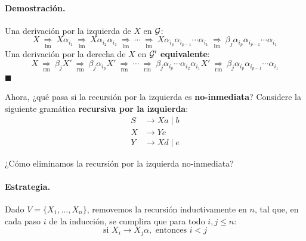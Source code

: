 \paragraph{Demostración.} Una derivación por la izquierda de $X$ en $\mathcal{G}$:
$$
    X \ \underset{\mathrm{lm}}{\Rightarrow} \ X \alpha_{i_1} \ \underset{\mathrm{lm}}{\Rightarrow} \ X \alpha_{i_2} \alpha_{i_1} \ \underset{\mathrm{lm}}{\Rightarrow} \ \cdots \ \underset{\mathrm{lm}}{\Rightarrow}\ X \alpha_{i_p} \alpha_{i_{p-1}} \cdots \alpha_{i_1} \ \underset{\mathrm{lm}}{\Rightarrow} \ \beta_j \alpha_{i_p} \alpha_{i_{p-1}} \cdots \alpha_{i_1}
$$
Una derivación por la derecha de $X$ en $\mathcal{G}'$ \textbf{equivalente}:
$$
    X \ \underset{\mathrm{rm}}{\Rightarrow} \ \beta_j X' \ \underset{\mathrm{rm}}{\Rightarrow} \ \beta_j \alpha_{i_p} X' \ \underset{\mathrm{rm}}{\Rightarrow} \ \cdots \ \underset{\mathrm{rm}}{\Rightarrow}\ \beta_j \alpha_{i_p} \cdots \alpha_{i_2} \alpha_{i_1} X' \ \underset{\mathrm{rm}}{\Rightarrow} \ \beta_j \alpha_{i_p} \alpha_{i_{p-1}} \cdots \alpha_{i_1}
$$
\hfill $\blacksquare$ \bigbreak

Ahora, ¿qué pasa si la recursión por la izquierda es \textbf{no-inmediata}? Considere la siguiente gramática \textbf{recursiva por la izquierda}:
\begin{align*}
    S & \to Xa \mid b \\
    X & \to Yc        \\
    Y & \to Xd \mid e
\end{align*}

¿Cómo eliminamos la recursión por la izquierda no-inmediata?
\paragraph{Estrategia.} Dado $V = \{X_1,\ldots,X_n\}$, removemos la recursión inductivamente en $n$, tal que, en cada paso $i$ de la inducción, se cumplira que para todo $i,j\leq n$:
$$
    \text{si } X_i \to X_j \alpha, \text{ entonces } i < j
$$

\vspace{-15pt}
\begin{algorithm}[hbt!]
    \DontPrintSemicolon
\end{algorithm}

